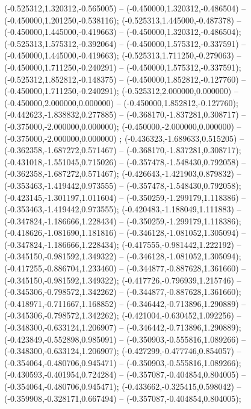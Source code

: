  (-0.525312,1.320312,-0.565005) -- (-0.450000,1.320312,-0.486504) -- (-0.450000,1.201250,-0.538116);
 (-0.525313,1.445000,-0.487378) -- (-0.450000,1.445000,-0.419663) -- (-0.450000,1.320312,-0.486504);
 (-0.525313,1.575312,-0.392064) -- (-0.450000,1.575312,-0.337591) -- (-0.450000,1.445000,-0.419663);
 (-0.525313,1.711250,-0.279063) -- (-0.450000,1.711250,-0.240291) -- (-0.450000,1.575312,-0.337591);
 (-0.525312,1.852812,-0.148375) -- (-0.450000,1.852812,-0.127760) -- (-0.450000,1.711250,-0.240291);
 (-0.525312,2.000000,0.000000) -- (-0.450000,2.000000,0.000000) -- (-0.450000,1.852812,-0.127760);
 (-0.442623,-1.838832,0.277885) -- (-0.368170,-1.837281,0.308717) -- (-0.375000,-2.000000,0.000000);
 (-0.450000,-2.000000,0.000000) -- (-0.375000,-2.000000,0.000000) ;
 (-0.436323,-1.689633,0.515205) -- (-0.362358,-1.687272,0.571467) -- (-0.368170,-1.837281,0.308717);
 (-0.431018,-1.551045,0.715026) -- (-0.357478,-1.548430,0.792058) -- (-0.362358,-1.687272,0.571467);
 (-0.426643,-1.421903,0.879832) -- (-0.353463,-1.419442,0.973555) -- (-0.357478,-1.548430,0.792058);
 (-0.423145,-1.301197,1.011604) -- (-0.350259,-1.299179,1.118386) -- (-0.353463,-1.419442,0.973555);
 (-0.420483,-1.188049,1.111883) -- (-0.347824,-1.186666,1.228434) -- (-0.350259,-1.299179,1.118386);
 (-0.418626,-1.081690,1.181816) -- (-0.346128,-1.081052,1.305094) -- (-0.347824,-1.186666,1.228434);
 (-0.417555,-0.981442,1.222192) -- (-0.345150,-0.981592,1.349322) -- (-0.346128,-1.081052,1.305094);
 (-0.417255,-0.886704,1.233460) -- (-0.344877,-0.887628,1.361660) -- (-0.345150,-0.981592,1.349322);
 (-0.417726,-0.796939,1.215746) -- (-0.345306,-0.798572,1.342262) -- (-0.344877,-0.887628,1.361660);
 (-0.418971,-0.711667,1.168852) -- (-0.346442,-0.713896,1.290889) -- (-0.345306,-0.798572,1.342262);
 (-0.421004,-0.630452,1.092256) -- (-0.348300,-0.633124,1.206907) -- (-0.346442,-0.713896,1.290889);
 (-0.423849,-0.552898,0.985091) -- (-0.350903,-0.555816,1.089266) -- (-0.348300,-0.633124,1.206907);
 (-0.427299,-0.477746,0.854057) -- (-0.354064,-0.480706,0.945471) -- (-0.350903,-0.555816,1.089266);
 (-0.430593,-0.401954,0.724284) -- (-0.357087,-0.404854,0.804005) -- (-0.354064,-0.480706,0.945471);
 (-0.433662,-0.325415,0.598042) -- (-0.359908,-0.328171,0.667494) -- (-0.357087,-0.404854,0.804005);

